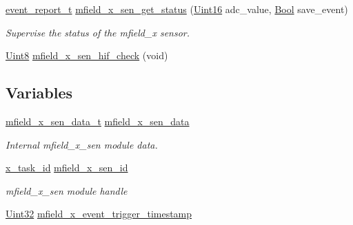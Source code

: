 \begin{DoxyCompactItemize}
\hyperlink{a00021_d6/d66/a00441}{event\+\_\+report\+\_\+t} \hyperlink{a00052_a3a46d0e69b27b3566e6d8465cf7a8b0a}{mfield\+\_\+x\+\_\+sen\+\_\+get\+\_\+status} (\hyperlink{a00072_a59a9f6be4562c327cbfb4f7e8e18f08b}{Uint16} adc\+\_\+value, \hyperlink{a00072_a253b248072cfc8bd812c69acd0046eed}{Bool} save\+\_\+event)
\begin{DoxyCompactList}\small\item\em Supervise the status of the mfield\+\_\+x sensor. \end{DoxyCompactList}\item 
\hyperlink{a00072_af84840501dec18061d18a68c162a8fa2}{Uint8} \hyperlink{a00052_ad309ab77ec43baa60232db1809199756}{mfield\+\_\+x\+\_\+sen\+\_\+hif\+\_\+check} (void)
\end{DoxyCompactItemize}
\subsection*{Variables}
\begin{DoxyCompactItemize}
\item 
\hyperlink{a00025_d8/de9/a00595}{mfield\+\_\+x\+\_\+sen\+\_\+data\+\_\+t} \hyperlink{a00052_af8c531b1ba5fea148fb9111e06058f92}{mfield\+\_\+x\+\_\+sen\+\_\+data}
\begin{DoxyCompactList}\small\item\em Internal mfield\+\_\+x\+\_\+sen module data. \end{DoxyCompactList}\item 
\hyperlink{a00036_ad5c3c5fbfd3e4aadf22830395484a71d}{x\+\_\+task\+\_\+id} \hyperlink{a00052_a19a33e680bf19d1aed76750132ed8b64}{mfield\+\_\+x\+\_\+sen\+\_\+id}
\begin{DoxyCompactList}\small\item\em mfield\+\_\+x\+\_\+sen module handle \end{DoxyCompactList}\item 
\hyperlink{a00072_aba99025e657f892beb7ff31cecf64653}{Uint32} \hyperlink{a00052_acb61c9078ac98b44c42bf119521b18b0}{mfield\+\_\+x\+\_\+event\+\_\+trigger\+\_\+timestamp}
\end{DoxyCompactItemize}


